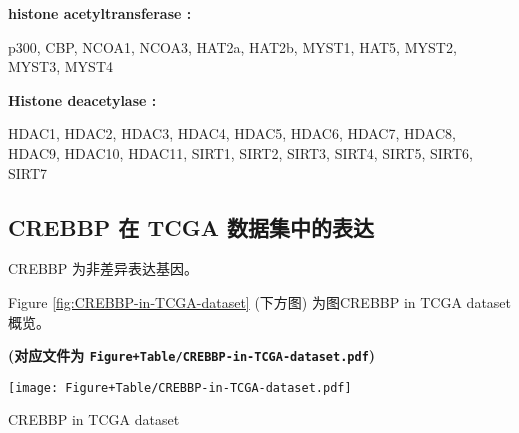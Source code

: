 \documentclass[
]{article}
\begin{document}
\begin{center}\begin{tcolorbox}[colback=gray!10, colframe=gray!50, width=0.9\linewidth, arc=1mm, boxrule=0.5pt]
\textbf{
histone acetyltransferase
:}

\vspace{0.5em}

    p300, CBP, NCOA1, NCOA3, HAT2a, HAT2b, MYST1, HAT5,
MYST2, MYST3, MYST4

\vspace{2em}


\textbf{
Histone deacetylase
:}

\vspace{0.5em}

    HDAC1, HDAC2, HDAC3, HDAC4, HDAC5, HDAC6, HDAC7, HDAC8,
HDAC9, HDAC10, HDAC11, SIRT1, SIRT2, SIRT3, SIRT4, SIRT5,
SIRT6, SIRT7

\vspace{2em}
\end{tcolorbox}
\end{center}

\hypertarget{crebbp-ux5728-tcga-ux6570ux636eux96c6ux4e2dux7684ux8868ux8fbe}{%
\subsection{CREBBP 在 TCGA 数据集中的表达}\label{crebbp-ux5728-tcga-ux6570ux636eux96c6ux4e2dux7684ux8868ux8fbe}}

CREBBP 为非差异表达基因。

Figure \ref{fig:CREBBP-in-TCGA-dataset} (下方图) 为图CREBBP in TCGA dataset概览。

\textbf{(对应文件为 \texttt{Figure+Table/CREBBP-in-TCGA-dataset.pdf})}

\def\@captype{figure}
\begin{center}
\texttt{[image: Figure+Table/CREBBP-in-TCGA-dataset.pdf]}
\caption{CREBBP in TCGA dataset}\label{fig:CREBBP-in-TCGA-dataset}
\end{center}
\end{document}
